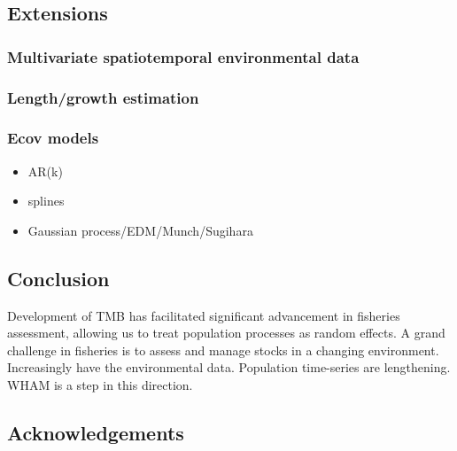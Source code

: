 \documentclass[]{article}
\providecommand{\tightlist}{%
  \setlength{\itemsep}{0pt}\setlength{\parskip}{0pt}}
\begin{document}
\hypertarget{extensions}{%
\subsection{Extensions}\label{extensions}}

\hypertarget{multivariate-spatiotemporal-environmental-data}{%
\subsubsection{Multivariate spatiotemporal environmental
data}\label{multivariate-spatiotemporal-environmental-data}}

\hypertarget{lengthgrowth-estimation}{%
\subsubsection{Length/growth estimation}\label{lengthgrowth-estimation}}

\hypertarget{ecov-models}{%
\subsubsection{Ecov models}\label{ecov-models}}

\begin{itemize}
\tightlist
\item
  AR(k)
\item
  splines
\item
  Gaussian process/EDM/Munch/Sugihara
\end{itemize}

\hypertarget{conclusion}{%
\subsection{Conclusion}\label{conclusion}}

Development of TMB has facilitated significant advancement in fisheries
assessment, allowing us to treat population processes as random effects.
A grand challenge in fisheries is to assess and manage stocks in a
changing environment. Increasingly have the environmental data.
Population time-series are lengthening. WHAM is a step in this
direction.

\hypertarget{acknowledgements}{%
\subsection*{Acknowledgements}\label{acknowledgements}}
\end{document}
